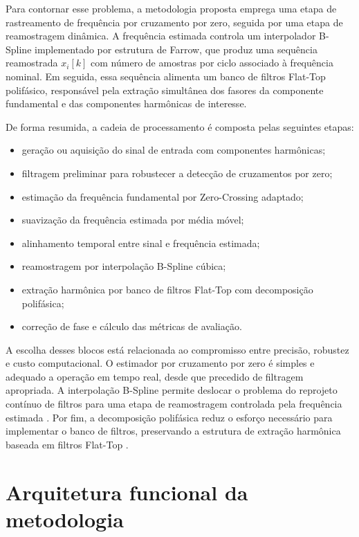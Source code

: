 Para contornar esse problema, a metodologia proposta emprega uma etapa de rastreamento de frequência por cruzamento por zero, seguida por uma etapa de reamostragem dinâmica. A frequência estimada controla um interpolador B-Spline implementado por estrutura de Farrow, que produz uma sequência reamostrada $x_i[k]$ com número de amostras por ciclo associado à frequência nominal. Em seguida, essa sequência alimenta um banco de filtros Flat-Top polifásico, responsável pela extração simultânea dos fasores da componente fundamental e das componentes harmônicas de interesse.

De forma resumida, a cadeia de processamento é composta pelas seguintes etapas:

\begin{itemize}
    \item geração ou aquisição do sinal de entrada com componentes harmônicas;
    \item filtragem preliminar para robustecer a detecção de cruzamentos por zero;
    \item estimação da frequência fundamental por Zero-Crossing adaptado;
    \item suavização da frequência estimada por média móvel;
    \item alinhamento temporal entre sinal e frequência estimada;
    \item reamostragem por interpolação B-Spline cúbica;
    \item extração harmônica por banco de filtros Flat-Top com decomposição polifásica;
    \item correção de fase e cálculo das métricas de avaliação.
\end{itemize}

A escolha desses blocos está relacionada ao compromisso entre precisão, robustez e custo computacional. O estimador por cruzamento por zero é simples e adequado a operação em tempo real, desde que precedido de filtragem apropriada. A interpolação B-Spline permite deslocar o problema do reprojeto contínuo de filtros para uma etapa de reamostragem controlada pela frequência estimada \cite{aleixo2022,aleixoTese}. Por fim, a decomposição polifásica reduz o esforço necessário para implementar o banco de filtros, preservando a estrutura de extração harmônica baseada em filtros Flat-Top \cite{duda2019,mk06}.

\section{Arquitetura funcional da metodologia}

